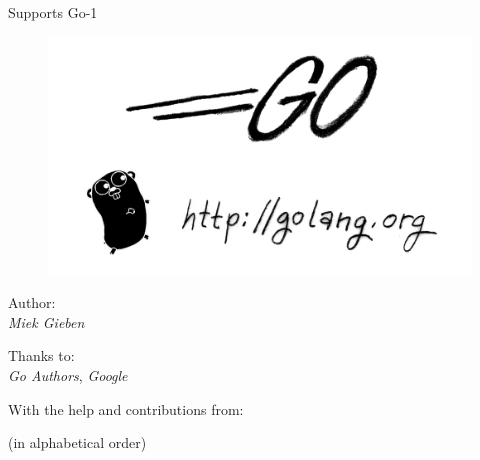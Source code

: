\documentclass[a4paper,twoside,openleft]{blocksbook}
\begin{document}
\thispagestyle{empty}
\newcommand{\version}{0.5}
\begin{center}
\\
\vspace{0.5cm}
Supports Go-1
\end{center}
\vspace*{3cm}
\begin{figure}[h!]
\begin{center}
    \includegraphics[scale=0.65]{fig/bumper-inverse.png}
\end{center}
\end{figure}
\vspace*{0.02\stockheight}
\begin{minipage}{0.4\textwidth}
\begin{flushleft} \large
\hspace*{2,0cm}Author:\\
\hspace*{2.0cm}\emph{Miek Gieben}\\
\vfill
\end{flushleft}
\end{minipage}
\hspace{5mm}
\begin{minipage}{0.4\textwidth}
\begin{flushright} \large
Thanks to:\\
\emph{Go Authors}, \emph{Google}\\
\vfill
\end{flushright}
\end{minipage}
\vspace*{1cm}
\begin{center}
With the help and contributions from: 

({\small in alphabetical order})


\end{center}
\end{document}
